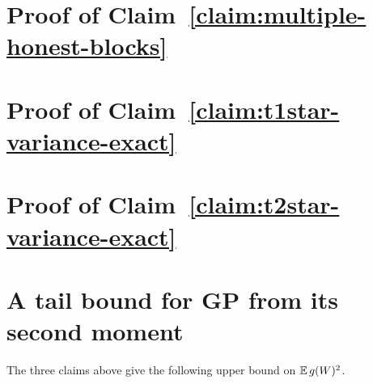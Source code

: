 \section{Proof of Claim~\ref{claim:multiple-honest-blocks}}\label{sec:praos-claim-multiple-honest-blocks}



\section{Proof of Claim~\ref{claim:t1star-variance-exact}}\label{sec:praos-claim-t1star-variance-exact}



\section{Proof of Claim~\ref{claim:t2star-variance-exact}}\label{sec:praos-claim-t2star-variance-exact}













\section{A tail bound for GP from its second moment}
The three claims above give the following upper bound on $\operatorname{\mathbb{E}} g(W)^2$.


